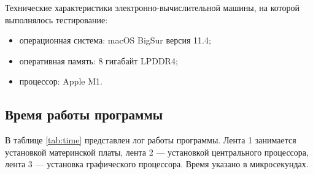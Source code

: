 Технические характеристики электронно-вычислительной машины, на которой выполнялось тестирование:

\begin{itemize}
    \item операционная система: macOS BigSur версия 11.4;
    \item оперативная память: 8 гигабайт LPDDR4;
    \item процессор: Apple M1.
\end{itemize}

\subsection{Время работы программы}

В таблице \ref{tab:time} представлен лог работы программы. Лента 1 занимается установкой материнской платы, лента 2 --- установкой центрального процессора, лента 3 --- установка графического процессора. Время указано в микросекундах. \\


